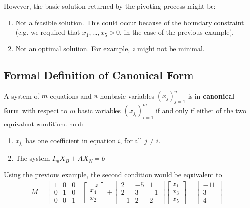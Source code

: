 However, the basic solution returned by the pivoting process might be:
\begin{enumerate}
    \item Not a feasible solution. This could occur because of the boundary
        constraint (e.g. we required that $x_1,\ldots,x_5>0$, in the case of the
        previous example).
    \item Not an optimal solution. For example, $z$ might not be minimal.
\end{enumerate}


\subsection{Formal Definition of Canonical Form}
A system of $m$ equations and $n$ nonbasic variables $(x_j)_{j=1}^n$ is in
\textbf{canonical form} with respect to $m$ basic variables $(x_{j_i})_{i=1}^m$
if and only if either of the two equivalent conditions hold:
\begin{enumerate}
    \item $x_{j_i}$ has one coefficient in equation $i$, for all $j \neq i$.
    \item The system $I_m X_B + A X_N = b$
\end{enumerate}

Using the previous example, the second condition would be equivalent to
\begin{align*}
    M = 
    \begin{bmatrix}
        1 & 0 & 0\\
        0 & 1 & 0\\
        0 & 0 & 1
    \end{bmatrix}
    \begin{bmatrix}
        -z\\
        x_4\\
        x_2
    \end{bmatrix}
    +
    \begin{bmatrix}
        2   &   -5  &   1   \\
        2   &   3   &   -1  \\
        -1  &   2   &   2 
    \end{bmatrix}
    \begin{bmatrix}
        x_1\\
        x_3\\
        x_5
    \end{bmatrix}
    =
    \begin{bmatrix}
        -11 \\
        3   \\
        4 
    \end{bmatrix}
\end{align*}


